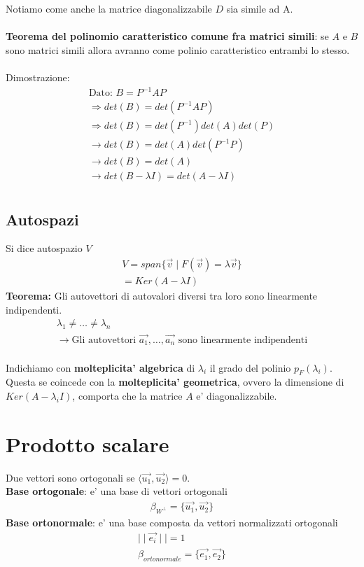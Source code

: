 \documentclass[10pt]{extarticle}
\begin{document}
Notiamo come anche la matrice diagonalizzabile $D$ sia simile ad A. \\
\vspace{3px}\\
\textbf{Teorema del polinomio caratteristico comune fra matrici simili}: se $A$ e $B$ sono matrici simili allora avranno come polinio caratteristico entrambi lo stesso. \\
\vspace{3px} \\
Dimostrazione: \\
\begin{align*}
    \text{Dato: } B=P^{-1}AP \\
    \Rightarrow det(B)=det(P^{-1}AP) \\
    \Rightarrow det(B)=det(P^{-1})det(A)det(P) \\
    \to det(B)=det(A)det(P^{-1}P) \\
    \to det(B)=det(A) \\
    \to det(B -\lambda I)=det(A -\lambda I) \\
\end{align*}
\subsection{Autospazi}
Si dice autospazio $V$
\begin{align*}
    V=span\{\vec{v} \mid F(\vec{v})=\lambda \vec{v}\} \\
    = Ker(A-\lambda I)
\end{align*}
\textbf{Teorema:} Gli autovettori di autovalori diversi tra loro sono linearmente indipendenti.
\begin{align*}
    \lambda_1\neq\dots\neq\lambda_n\\
    \to \text{Gli autovettori $\vec{a_1},\dots,\vec{a_n}$ sono linearmente indipendenti}
\end{align*}
\vspace{1em} \\
Indichiamo con \textbf{molteplicita' algebrica} di $\lambda_i$ il grado del polinio $p_{F}(\lambda_i)$. Questa  se coincede con la \textbf{molteplicita' geometrica}, ovvero la dimensione di $Ker(A-\lambda_i I)$, comporta che la matrice $A$ e' diagonalizzabile.

\section{Prodotto scalare}
Due vettori sono ortogonali se $\langle \vec{u_1},\vec{u_2}\rangle=0$. \\
\textbf{Base ortogonale}: e' una base di vettori ortogonali
\begin{align*}
    \beta_{W^{\bot}}=\{\vec{u_1},\vec{u_2}\}
\end{align*}
\textbf{Base ortonormale}: e' una base composta da vettori normalizzati ortogonali
\begin{align*}
    \mid\mid \vec{e_i} \mid\mid =1 \\
    \beta_{ortonormale}=\{\vec{e_1},\vec{e_2}\} \\
\end{align*}
\end{document}
